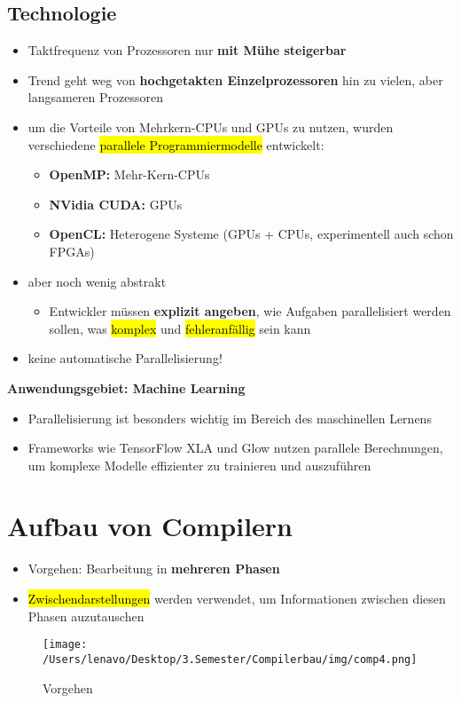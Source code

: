 \documentclass[a4paper, 10pt]{article}
\begin{document}
\subsection{Technologie}
\begin{itemize}
    \item Taktfrequenz von Prozessoren nur \textbf{mit Mühe steigerbar} 
    \item Trend geht weg von \textbf{hochgetakten Einzelprozessoren} hin zu vielen, aber langsameren Prozessoren
    \item um die Vorteile von Mehrkern-CPUs und GPUs zu nutzen, wurden verschiedene \hl{parallele Programmiermodelle} entwickelt:
    \begin{itemize}
        \item \textbf{OpenMP:} Mehr-Kern-CPUs
        \item \textbf{NVidia CUDA:} GPUs
        \item \textbf{OpenCL:} Heterogene Systeme (GPUs + CPUs, experimentell auch schon FPGAs)
    \end{itemize}
    \item aber noch wenig abstrakt
    \begin{itemize}
        \item Entwickler müssen \textbf{explizit angeben}, wie Aufgaben parallelisiert werden sollen, was \hl{komplex} und \hl{fehleranfällig} sein kann

    \end{itemize}
    \item keine automatische Parallelisierung!
\end{itemize}
\textbf{Anwendungsgebiet: Machine Learning}
\begin{itemize}
    \item Parallelisierung ist besonders wichtig im Bereich des maschinellen Lernens
    \item Frameworks wie TensorFlow XLA und Glow nutzen parallele Berechnungen, um komplexe Modelle effizienter zu trainieren und auszuführen
\end{itemize}

\section{Aufbau von Compilern}
\begin{itemize}
    \item Vorgehen: Bearbeitung in \textbf{mehreren Phasen}
    \item \hl{Zwischendarstellungen} werden verwendet, um Informationen zwischen diesen Phasen auzutauschen
\end{itemize}
\begin{figure}[h]
    \centering
    \texttt{[image: /Users/lenavo/Desktop/3.Semester/Compilerbau/img/comp4.png]}
    \caption{Vorgehen}
    \label{fig:enter-label}
\end{figure}
\end{document}
